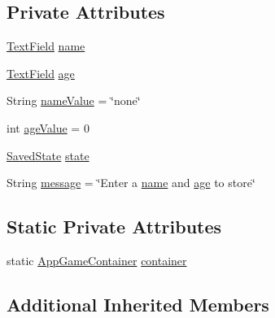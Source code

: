 \subsection*{Private Attributes}
\begin{DoxyCompactItemize}
\item 
\mbox{\hyperlink{classorg_1_1newdawn_1_1slick_1_1gui_1_1_text_field}{Text\+Field}} \mbox{\hyperlink{classorg_1_1newdawn_1_1slick_1_1tests_1_1_saved_state_test_a381fa55faa9d50339c3c5b76d23434ad}{name}}
\item 
\mbox{\hyperlink{classorg_1_1newdawn_1_1slick_1_1gui_1_1_text_field}{Text\+Field}} \mbox{\hyperlink{classorg_1_1newdawn_1_1slick_1_1tests_1_1_saved_state_test_afe659155529ab918d03931356abaeaa5}{age}}
\item 
String \mbox{\hyperlink{classorg_1_1newdawn_1_1slick_1_1tests_1_1_saved_state_test_a896dc73f5a51059f069e3d3d0d2d1cf0}{name\+Value}} = \char`\"{}none\char`\"{}
\item 
int \mbox{\hyperlink{classorg_1_1newdawn_1_1slick_1_1tests_1_1_saved_state_test_a648519ca55d3c3d0601e9a2dfca5e5f4}{age\+Value}} = 0
\item 
\mbox{\hyperlink{classorg_1_1newdawn_1_1slick_1_1_saved_state}{Saved\+State}} \mbox{\hyperlink{classorg_1_1newdawn_1_1slick_1_1tests_1_1_saved_state_test_ad1cb5b54c3d8617579e2d16f02f5327b}{state}}
\item 
String \mbox{\hyperlink{classorg_1_1newdawn_1_1slick_1_1tests_1_1_saved_state_test_a4798438e001d225799efabfcf2188c6e}{message}} = \char`\"{}Enter a \mbox{\hyperlink{classorg_1_1newdawn_1_1slick_1_1tests_1_1_saved_state_test_a381fa55faa9d50339c3c5b76d23434ad}{name}} and \mbox{\hyperlink{classorg_1_1newdawn_1_1slick_1_1tests_1_1_saved_state_test_afe659155529ab918d03931356abaeaa5}{age}} to store\char`\"{}
\end{DoxyCompactItemize}
\subsection*{Static Private Attributes}
\begin{DoxyCompactItemize}
\item 
static \mbox{\hyperlink{classorg_1_1newdawn_1_1slick_1_1_app_game_container}{App\+Game\+Container}} \mbox{\hyperlink{classorg_1_1newdawn_1_1slick_1_1tests_1_1_saved_state_test_ad6f5870be107273edb69949feace3400}{container}}
\end{DoxyCompactItemize}
\subsection*{Additional Inherited Members}


